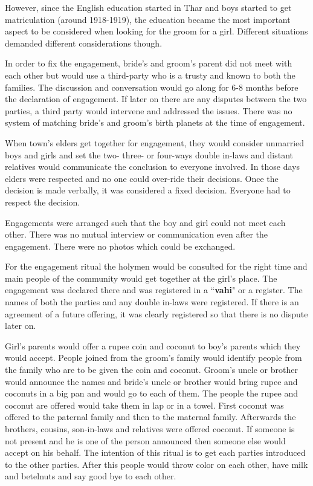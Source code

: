 However, since the English education started in Thar and boys started to get
matriculation (around 1918-1919), the education became the most important
aspect to be considered when looking for the groom for a girl. Different
situations demanded different considerations though.

In order to fix the engagement, bride's and groom's parent did not meet with
each other but would use a third-party who is a trusty and known to both the
families. The discussion and conversation would go along for 6-8 months before
the declaration of engagement. If later on there are any disputes between the
two parties, a third party would intervene and addressed the issues. There was
no system of matching bride's and groom's birth planets at the time of
engagement.

When town's elders get together for engagement, they would consider unmarried
boys and girls and set the two- three- or four-ways double in-laws and distant
relatives would communicate the conclusion to everyone involved. In those days
elders were respected and no one could over-ride their decisions. Once the
decision is made verbally, it was considered a fixed decision. Everyone had to
respect the decision.

Engagements were arranged such that the boy and girl could not meet each other.
There was no mutual interview or communication even after the engagement. There
were no photos which could be exchanged.

For the engagement ritual the holymen would be consulted for the right time and
main people of the community would get together at the girl's place. The
engagement was declared there and was registered in a ``\textbf{vahi}" or a
register. The names of both the parties and any double in-laws were registered.
If there is an agreement of a future offering, it was clearly registered so
that there is no dispute later on.

Girl's parents would offer a rupee coin and coconut to boy's parents which they
would accept. People joined from the groom's family would identify people from
the family who are to be given the coin and coconut. Groom's uncle or brother
would announce the names and bride's uncle or brother would bring rupee and
coconuts in a big pan and would go to each of them. The people the rupee and
coconut are offered would take them in lap or in a towel. First coconut was
offered to the paternal family and then to the maternal family. Afterwards the
brothers, cousins, son-in-laws and relatives were offered coconut. If someone
is not present and he is one of the person announced then someone else would
accept on his behalf. The intention of this ritual is to get each parties
introduced to the other parties. After this people would throw color on each
other, have milk and betelnuts and say good bye to each other.

